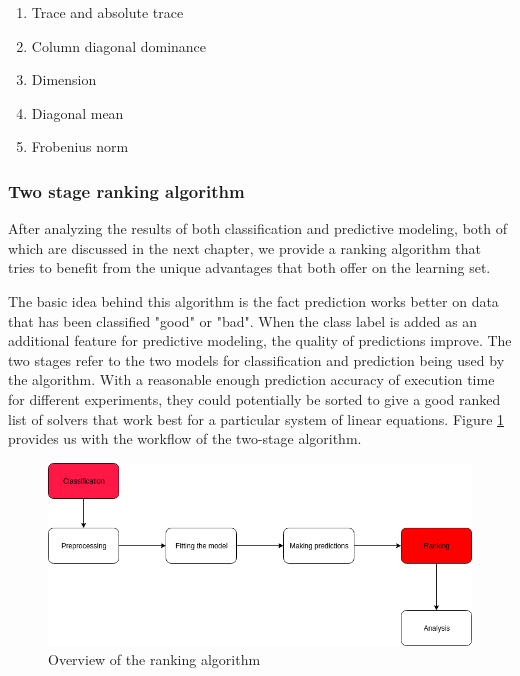 \begin{enumerate}
    \item Trace and absolute trace
    \item Column diagonal dominance
    \item Dimension
    \item Diagonal mean
    \item Frobenius norm
\end{enumerate}

\subsubsection{Two stage ranking algorithm}
After analyzing the results of both classification and predictive modeling, both of which are discussed in the next chapter, we provide a ranking algorithm that tries to benefit from the unique advantages that both offer on the learning set. 



The basic idea behind this algorithm is the fact prediction works better on data that has been classified "good" or "bad". When the class label is added as an additional feature for predictive modeling, the quality of predictions improve. The two stages refer to the two models for classification and prediction being used by the algorithm. With a reasonable enough prediction accuracy of execution time for different experiments, they could potentially be sorted to give a good ranked list of solvers that work best for a particular system of linear equations. Figure \ref{Overview of the ranking algorithm} provides us with the workflow of the two-stage algorithm.


\begin{figure}
    \centering
    \includegraphics[width=1\columnwidth]{figures/ranking_overview.png}
    \caption{Overview of the ranking algorithm}
    \label{Overview of the ranking algorithm}
\end{figure}

